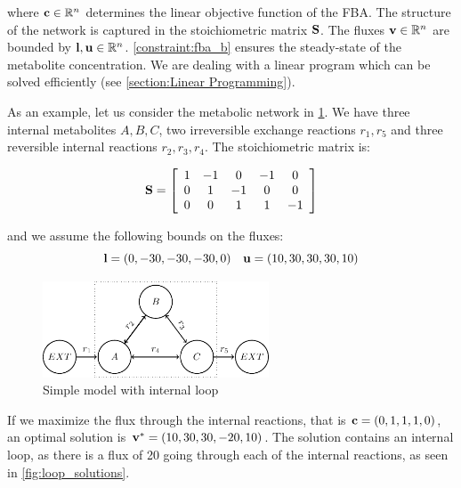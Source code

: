 where $\bold c \in \mathbb{R}^n$ determines the linear objective function of the FBA. The structure of the network is captured in the stoichiometric matrix $\bold S$. The fluxes $\bold v \in \mathbb{R}^n$ are bounded by $\bold l, \bold u \in \mathbb{R}^n$. \cref{constraint:fba_b} ensures the steady-state of the metabolite concentration. We are dealing with a linear program which can be solved efficiently (see \cref{section:Linear Programming}).

As an example, let us consider the metabolic network in \cref{fig:loop}. We have three internal metabolites $A,B,C$, two irreversible exchange reactions $r_1, r_5$ and three reversible internal reactions $r_2, r_3, r_4$. The stoichiometric matrix is: 

\begin{equation} \label{Eq:S_loop}
    \bold S =
    \left[\begin{array}{ccccc}
        1 & -1 & 0 & -1 & 0 \\
        0 & 1 & -1 & 0 & 0 \\
        0 & 0 & 1 & 1 & -1 \\
    \end{array}\right]        
\end{equation}

\quad and we assume the following bounds on the fluxes: 
\begin{equation} \label{Eq:bounds_loop}
    \bold l = (0,-30,-30,-30,0) \quad \bold u = (10,30,30,30,10)
\end{equation}

\begin{figure}[h!]
    \centering
    \includegraphics[width=0.6\textwidth]{Images/tikz_graphs_one_loop.pdf}
    \caption{Simple model with internal loop}
    \label{fig:loop}
\end{figure}

If we maximize the flux through the internal reactions, that is $\bold c = (0,1,1,1,0)$, an optimal solution is $\bold v^* = (10, 30, 30, -20, 10)$. The solution contains an internal loop, as there is a flux of 20 going through each of the internal reactions, as seen in \cref{fig:loop_solutions}.

